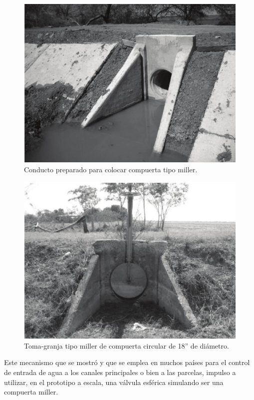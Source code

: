 \begin{figure}[h]
\centering
\includegraphics[scale=.55]{./Figures/ConductoPreparadoParaCompuertaMiller.jpeg}
\caption{Conducto preparado para colocar compuerta tipo miller.}
\label{fig:CeldaPrimaria}
\end{figure}

\begin{figure}[h]
\centering
\includegraphics[scale=.55]{./Figures/compuertamillercircular.jpeg}
\caption{Toma-granja tipo miller de compuerta circular de 18” de diámetro.}
\label{fig:CeldaPrimaria}
\end{figure}

Este mecanismo que se mostró y que se emplea en muchos países para el control de entrada de agua a los canales principales o bien a las parcelas, impulso a utilizar, en el prototipo a escala, una válvula esférica simulando ser una compuerta miller.   

